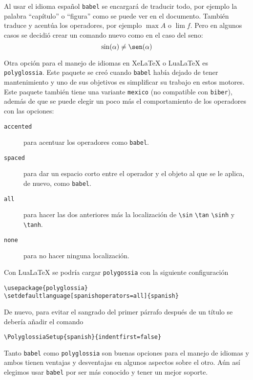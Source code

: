Al usar el idioma español \texttt{babel} se encargará de traducir todo, por
ejemplo la palabra \enquote{capítulo} o \enquote{figura} como se puede ver
en el documento. También traduce y acentúa los operadores, por ejemplo
\(\max A\) o \(\lim f\). Pero en algunos casos se decidió crear un comando
nuevo como en el caso del seno:
\[
  \sin(\alpha)\ne\sen(\alpha)
\]


Otra opción para el manejo de idiomas en Xe\LaTeX{} o Lua\LaTeX{} es
\texttt{polyglossia}. Este paquete se creó cuando \texttt{babel} había
dejado de tener mantenimiento y uno de sus objetivos es simplificar su
trabajo en estos motores. Este paquete también tiene una variante
\texttt{mexico} (no compatible con \texttt{biber}), además de que se puede
elegir un poco más el comportamiento de los operadores con las opciones:
\begin{description}
  \item[\texttt{accented}] para acentuar los operadores como \texttt{babel}.
  \item[\texttt{spaced}] para dar un espacio corto entre el operador y el objeto al que se le aplica, de nuevo, como \texttt{babel}.
  \item[\texttt{all}] para hacer las dos anteriores más la localización de \verb|\sin| \verb|\tan| \verb|\sinh| y \verb|\tanh|.
  \item[\texttt{none}] para no hacer ninguna localización.
\end{description}
Con Lua\LaTeX{} se podría cargar \texttt{polygossia} con la siguiente
configuración
\begin{flushleft}
  \verb|\usepackage{polyglossia}| \\
  \verb|\setdefaultlanguage[spanishoperators=all]{spanish}|
\end{flushleft}

De nuevo, para evitar el sangrado del primer párrafo después de un título
se debería añadir el comando
\begin{flushleft}
  \verb|\PolyglossiaSetup{spanish}{indentfirst=false}|
\end{flushleft}

Tanto \texttt{babel} como \texttt{polyglossia} son buenas opciones para el
manejo de idiomas y ambos tienen ventajas y desventajas en algunos aspectos
sobre el otro. Aún así elegimos usar \texttt{babel} por ser más conocido y tener un mejor soporte.


